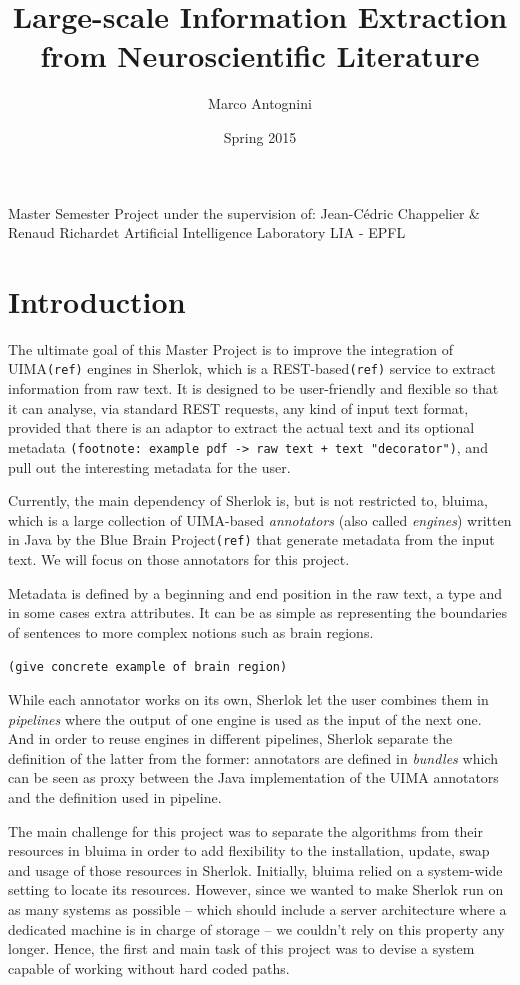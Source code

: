 \documentclass{article}
\title{Large-scale Information Extraction from Neuroscientific Literature}
\date{Spring 2015}
\author{Marco Antognini}
\newcommand{\TODO}[1]{\texttt{\textcolor{YellowOrange}{(#1)}}} %
\begin{document}
\maketitle

Master Semester Project under the supervision of:
Jean-Cédric Chappelier \&
Renaud Richardet
Artificial Intelligence Laboratory LIA - EPFL

\newpage
{}


\tableofcontents

\section{Introduction}

The ultimate goal of this Master Project is to improve the integration of UIMA\TODO{ref} engines in Sherlok, which is a REST-based\TODO{ref} service to extract information from raw text. It is designed to be user-friendly and flexible so that it can analyse, via standard REST requests, any kind of input text format, provided that there is an adaptor to extract the actual text and its optional metadata \TODO{footnote: example pdf -> raw text + text "decorator"}, and pull out the interesting metadata for the user.

Currently, the main dependency of Sherlok is, but is not restricted to, bluima, which is a large collection of UIMA-based \textit{annotators} (also called \textit{engines}) written in Java by the Blue Brain Project\TODO{ref} that generate metadata from the input text. We will focus on those annotators for this project.

Metadata is defined by a beginning and end position in the raw text, a type and in some cases extra attributes. It can be as simple as representing the boundaries of sentences to more complex notions such as brain regions.

\TODO{give concrete example of brain region}

While each annotator works on its own, Sherlok let the user combines them in \textit{pipelines} where the output of one engine is used as the input of the next one. And in order to reuse engines in different pipelines, Sherlok separate the definition of the latter from the former: annotators are defined in \textit{bundles} which can be seen as proxy between the Java implementation of the UIMA annotators and the definition used in pipeline.

The main challenge for this project was to separate the algorithms from their resources in bluima in order to add flexibility to the installation, update, swap and usage of those resources in Sherlok. Initially, bluima relied on a system-wide setting to locate its resources. However, since we wanted to make Sherlok run on as many systems as possible -- which should include a server architecture where a dedicated machine is in charge of storage -- we couldn't rely on this property any longer. Hence, the first and main task of this project was to devise a system capable of working without hard coded paths.
\end{document}
